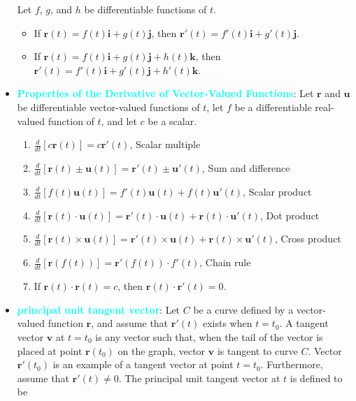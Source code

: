 \documentclass{report}
\begin{document}
\begin{itemize}
           Let $f$, $g$, and $h$ be differentiable functions of $t$.
           \begin{itemize}
               \item If $\mathbf{r}(t) = f(t)\mathbf{i} + g(t)\mathbf{j}$, then $\mathbf{r}'(t) = f'(t)\mathbf{i} + g'(t)\mathbf{j}$.
               \item If $\mathbf{r}(t) = f(t)\mathbf{i} + g(t)\mathbf{j} + h(t)\mathbf{k}$, then $\mathbf{r}'(t) = f'(t)\mathbf{i} + g'(t)\mathbf{j} + h'(t)\mathbf{k}$.
           \end{itemize}
           \pagebreak 
       \item \textbf{\textcolor{cyan}{Properties of the Derivative of Vector-Valued Functions}}:
           Let $\mathbf{r}$ and $\mathbf{u}$ be differentiable vector-valued functions of $t$, let $f$ be a differentiable real-valued function of $t$, and let $c$ be a scalar.
           \begin{enumerate}
               \item $\frac{d}{dt}[c\mathbf{r}(t)] = c\mathbf{r}'(t)$, Scalar multiple
               \item $\frac{d}{dt}[\mathbf{r}(t) \pm \mathbf{u}(t)] = \mathbf{r}'(t) \pm \mathbf{u}'(t)$, Sum and difference
               \item $\frac{d}{dt}[f(t)\mathbf{u}(t)] = f'(t)\mathbf{u}(t) + f(t)\mathbf{u}'(t)$, Scalar product
               \item $\frac{d}{dt}[\mathbf{r}(t) \cdot \mathbf{u}(t)] = \mathbf{r}'(t) \cdot \mathbf{u}(t) + \mathbf{r}(t) \cdot \mathbf{u}'(t)$, Dot product
               \item $\frac{d}{dt}[\mathbf{r}(t) \times \mathbf{u}(t)] = \mathbf{r}'(t) \times \mathbf{u}(t) + \mathbf{r}(t) \times \mathbf{u}'(t)$, Cross product
               \item $\frac{d}{dt}[\mathbf{r}(f(t))] = \mathbf{r}'(f(t)) \cdot f'(t)$, Chain rule
               \item If $\mathbf{r}(t) \cdot \mathbf{r}(t) = c$, then $\mathbf{r}(t) \cdot \mathbf{r}'(t) = 0$.
           \end{enumerate}
       \item \textbf{\textcolor{cyan}{principal unit tangent vector}}:
           Let $C$ be a curve defined by a vector-valued function $\mathbf{r}$, and assume that $\mathbf{r}'(t)$ exists when $t = t_0$. A tangent vector $\mathbf{v}$ at $t = t_0$ is any vector such that, when the tail of the vector is placed at point $\mathbf{r}(t_0)$ on the graph, vector $\mathbf{v}$ is tangent to curve $C$. Vector $\mathbf{r}'(t_0)$ is an example of a tangent vector at point $t = t_0$. Furthermore, assume that $\mathbf{r}'(t) \neq 0$. The principal unit tangent vector at $t$ is defined to be

\end{itemize}
\end{document}
